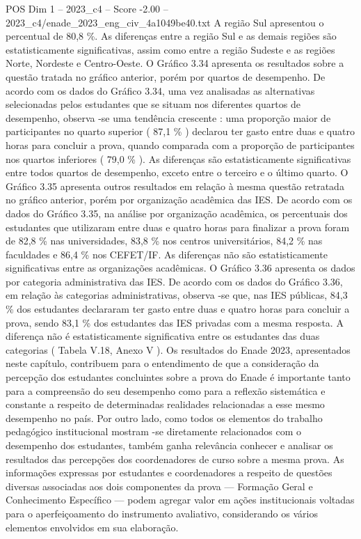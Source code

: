 \begin{textsample}{POS Dim 1 – 2023\_c4 – Score -2.00 – 2023\_c4/enade\_2023\_eng\_civ\_4a1049be40.txt}
A região Sul apresentou o percentual de 80,8 \%.
As diferenças entre a região Sul e as demais regiões são estatisticamente significativas, assim como entre a região Sudeste e as regiões Norte, Nordeste e Centro-Oeste.
O Gráfico 3.34 apresenta os resultados sobre a questão tratada no gráfico anterior, porém por quartos de desempenho.
De acordo com os dados do Gráfico 3.34, uma vez analisadas as alternativas selecionadas pelos estudantes que se situam nos diferentes quartos de desempenho, observa -se uma tendência crescente : uma proporção maior de participantes no quarto superior ( 87,1 \% ) declarou ter gasto entre duas e quatro horas para concluir a prova, quando comparada com a proporção de participantes nos quartos inferiores ( 79,0 \% ).
As diferenças são estatisticamente significativas entre todos quartos de desempenho, exceto entre o terceiro e o último quarto.
O Gráfico 3.35 apresenta outros resultados em relação à mesma questão retratada no gráfico anterior, porém por organização acadêmica das IES.
De acordo com os dados do Gráfico 3.35, na análise por organização acadêmica, os percentuais dos estudantes que utilizaram entre duas e quatro horas para finalizar a prova foram de 82,8 \% nas universidades, 83,8 \% nos centros universitários, 84,2 \% nas faculdades e 86,4 \% nos CEFET/IF.
As diferenças não são estatisticamente significativas entre as organizações acadêmicas.
O Gráfico 3.36 apresenta os dados por categoria administrativa das IES.
De acordo com os dados do Gráfico 3.36, em relação às categorias administrativas, observa -se que, nas IES públicas, 84,3 \% dos estudantes declararam ter gasto entre duas e quatro horas para concluir a prova, sendo 83,1 \% dos estudantes das IES privadas com a mesma resposta.
A diferença não é estatisticamente significativa entre os estudantes das duas categorias ( Tabela V.18, Anexo V ).
Os resultados do Enade 2023, apresentados neste capítulo, contribuem para o entendimento de que a consideração da percepção dos estudantes concluintes sobre a prova do Enade é importante tanto para a compreensão do seu desempenho como para a reflexão sistemática e constante a respeito de determinadas realidades relacionadas a esse mesmo desempenho no país.
Por outro lado, como todos os elementos do trabalho pedagógico institucional mostram -se diretamente relacionados com o desempenho dos estudantes, também ganha relevância conhecer e analisar os resultados das percepções dos coordenadores de curso sobre a mesma prova.
As informações expressas por estudantes e coordenadores a respeito de questões diversas associadas aos dois componentes da prova — Formação Geral e Conhecimento Específico — podem agregar valor em ações institucionais voltadas para o aperfeiçoamento do instrumento avaliativo, considerando os vários elementos envolvidos em sua elaboração.

\end{textsample}
